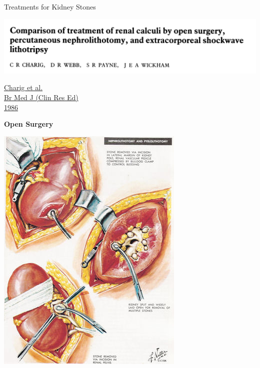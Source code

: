 \documentclass[8pt,aspectratio=169]{beamer}
\begin{document}

\begin{frame}{Treatments for Kidney Stones}

  \begin{minipage}{0.8\textwidth}

    \includegraphics[width=\textwidth]{images/charig1986_title.png}

  \end{minipage}%
  \begin{minipage}{0.2\textwidth}
    \href{\charigURL}{
      \small
      Charig et al. \\
      Br Med J (Clin Res Ed) \\
      1986
    }
  \end{minipage}

  \begin{minipage}[t]{0.25\textwidth}

    {\bfseries Open Surgery}

    \includegraphics[width=\textwidth]{images/open_surgery.jpg}


\end{minipage}
\end{frame}
\end{document}
